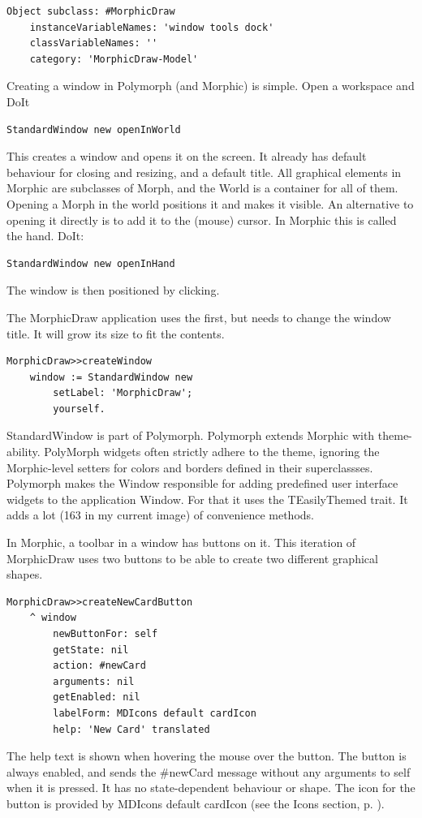\documentclass[10pt]{article}   	%
\begin{document}
\begin{verbatim}
Object subclass: #MorphicDraw
    instanceVariableNames: 'window tools dock'
    classVariableNames: ''
    category: 'MorphicDraw-Model'
\end{verbatim}

Creating a window in Polymorph (and Morphic)  is simple. Open a workspace and DoIt
\begin{verbatim}
StandardWindow new openInWorld 
\end{verbatim} 
This creates a window and opens it on the screen. 
It already has default behaviour for closing and resizing, and a default title. 
All graphical elements in Morphic are subclasses of Morph, and the 
World is a container for all of them. Opening a Morph in the world
positions it and makes it visible. An alternative to opening it directly is
to add it to the (mouse) cursor. In Morphic this is called the hand.
DoIt:
\begin{verbatim}
StandardWindow new openInHand 
\end{verbatim} 
The window is then positioned by clicking.

The MorphicDraw application uses the first, but needs to change 
the window title. It will grow its size to fit the contents.

\begin{verbatim}
MorphicDraw>>createWindow
    window := StandardWindow new
        setLabel: 'MorphicDraw';
        yourself.
\end{verbatim}

StandardWindow is part of Polymorph. Polymorph extends Morphic
with theme-ability. PolyMorph widgets often strictly adhere to the theme,
ignoring the Morphic-level setters for colors and borders defined in
their superclassses.  Polymorph makes the 
Window responsible for adding predefined user interface widgets
to the application Window. For that it uses the TEasilyThemed 
trait. It adds a lot (163 in my current image) of convenience methods.

In Morphic, a toolbar in a window has buttons on it. This iteration of
MorphicDraw uses two buttons to be able to create two different 
graphical shapes.

\begin{verbatim}
MorphicDraw>>createNewCardButton
    ^ window
        newButtonFor: self
        getState: nil
        action: #newCard
        arguments: nil
        getEnabled: nil
        labelForm: MDIcons default cardIcon
        help: 'New Card' translated
\end{verbatim}
The help text is shown when hovering the mouse over the button.
The button is always enabled, and sends the \#newCard message 
without any arguments to self when it is pressed. It has no 
state-dependent behaviour or shape. The icon for the button
is provided by MDIcons default cardIcon (see the Icons section,  p. \pageref{Icons}).
\end{document}

